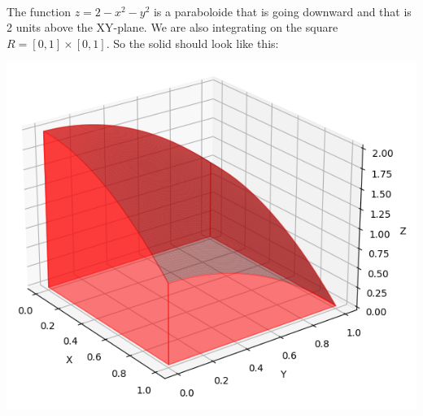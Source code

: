 	\spc
	
	\\
	The function $z= 2 - x^2 - y^2$ is a paraboloide that is going downward and that is 2 units above the XY-plane. We are also integrating on the square $R = [0, 1] \times [0, 1]$. So the solid should look like this:
		\begin{center}
		\includegraphics[scale=0.42]{Prob36-Pic2.png}
		\end{center}
	
	
